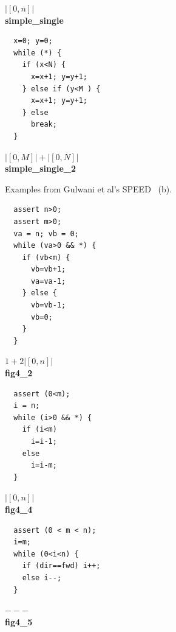 \documentclass{sigplanconf}
\begin{document}
{\begin{figure}
\begin{minipage}[b]{\progwidth}
\begin{center}
$|[0,n]|$
\\[.7\baselineskip]
      {\bf simple\_single}
    \end{center}
  \end{minipage}
%
%
  \begin{minipage}[b]{\progwidth}
    \begin{center}
   \begin{lstlisting}
  x=0; y=0;
  while (*) {
    if (x<N) {
      x=x+1; y=y+1;
    } else if (y<M ) {
      x=x+1; y=y+1;
    } else
      break;
  }
   \end{lstlisting}

$|[0, M]| + |[0, N]|$
\\[.7\baselineskip]
      {\bf simple\_single\_2}
    \end{center}
  \end{minipage}

   \caption{Examples from Gulwani et al's SPEED~\cite{GulwaniMC09} (b).}
  \label{fig:cat2b}
\end{figure}





\begin{figure}
 \setlength{\progwidth}{.24\linewidth}
  \centering
%
%
  \begin{minipage}[b]{\progwidth}
    \begin{center}
   \begin{lstlisting}
  assert n>0;
  assert m>0;
  va = n; vb = 0;
  while (va>0 && *) {
    if (vb<m) {
      vb=vb+1;
      va=va-1;
    } else {
      vb=vb-1;
      vb=0;
    }
  }
   \end{lstlisting}
$1 + 2|[0, n]|$
\\[.7\baselineskip]
      {\bf fig4\_2}
    \end{center}
  \end{minipage}
%
%
%
%
  \begin{minipage}[b]{\progwidth}
    \begin{center}
   \begin{lstlisting}
  assert (0<m);
  i = n;
  while (i>0 && *) {
    if (i<m)
      i=i-1;
    else
      i=i-m;
  }
   \end{lstlisting}
$|[0, n]|$
\\[.7\baselineskip]
      {\bf fig4\_4}
    \end{center}
  \end{minipage}
%
%
  \begin{minipage}[b]{\progwidth}
    \begin{center}
   \begin{lstlisting}
  assert (0 < m < n);
  i=m;
  while (0<i<n) {
    if (dir==fwd) i++;
    else i--;
  }
   \end{lstlisting}
$---$
\\[.7\baselineskip]
      {\bf fig4\_5}
    \end{center}
  \end{minipage}


\end{figure}}
\end{document}
